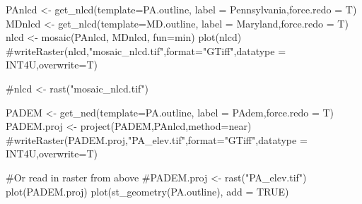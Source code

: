 \documentclass[
  letterpaper,
]{book}
\newenvironment{Shaded}{\begin{snugshade}}{\end{snugshade}}
\newcommand{\AttributeTok}[1]{\textcolor[rgb]{0.40,0.45,0.13}{#1}}
\newcommand{\CommentTok}[1]{\textcolor[rgb]{0.37,0.37,0.37}{#1}}
\newcommand{\ConstantTok}[1]{\textcolor[rgb]{0.56,0.35,0.01}{#1}}
\newcommand{\FunctionTok}[1]{\textcolor[rgb]{0.28,0.35,0.67}{#1}}
\newcommand{\NormalTok}[1]{\textcolor[rgb]{0.00,0.23,0.31}{#1}}
\newcommand{\OtherTok}[1]{\textcolor[rgb]{0.00,0.23,0.31}{#1}}
\newcommand{\StringTok}[1]{\textcolor[rgb]{0.13,0.47,0.30}{#1}}
\begin{document}
\begin{Shaded}
\begin{Highlighting}[]
\NormalTok{PAnlcd }\OtherTok{\textless{}{-}} \FunctionTok{get\_nlcd}\NormalTok{(}\AttributeTok{template=}\NormalTok{PA.outline, }\AttributeTok{label =} \StringTok{\textquotesingle{}Pennsylvania\textquotesingle{}}\NormalTok{,}\AttributeTok{force.redo =}\NormalTok{ T)}
\NormalTok{MDnlcd }\OtherTok{\textless{}{-}} \FunctionTok{get\_nlcd}\NormalTok{(}\AttributeTok{template=}\NormalTok{MD.outline, }\AttributeTok{label =} \StringTok{\textquotesingle{}Maryland\textquotesingle{}}\NormalTok{,}\AttributeTok{force.redo =}\NormalTok{ T)}
\NormalTok{nlcd }\OtherTok{\textless{}{-}} \FunctionTok{mosaic}\NormalTok{(PAnlcd, MDnlcd, }\AttributeTok{fun=}\NormalTok{min)}
\FunctionTok{plot}\NormalTok{(nlcd)}
\CommentTok{\#writeRaster(nlcd,"mosaic\_nlcd.tif",format="GTiff",datatype = \textquotesingle{}INT4U\textquotesingle{},overwrite=T)}

\CommentTok{\#nlcd \textless{}{-} rast("mosaic\_nlcd.tif")}

\NormalTok{PADEM }\OtherTok{\textless{}{-}} \FunctionTok{get\_ned}\NormalTok{(}\AttributeTok{template=}\NormalTok{PA.outline, }\AttributeTok{label =} \StringTok{\textquotesingle{}PAdem\textquotesingle{}}\NormalTok{,}\AttributeTok{force.redo =}\NormalTok{ T)}
\NormalTok{PADEM.proj }\OtherTok{\textless{}{-}} \FunctionTok{project}\NormalTok{(PADEM,PAnlcd,}\AttributeTok{method=}\StringTok{\textquotesingle{}near\textquotesingle{}}\NormalTok{)}
\CommentTok{\#writeRaster(PADEM.proj,"PA\_elev.tif",format="GTiff",datatype = \textquotesingle{}INT4U\textquotesingle{},overwrite=T)}

\CommentTok{\#Or read in raster from above}
\CommentTok{\#PADEM.proj \textless{}{-} rast("PA\_elev.tif")}
\FunctionTok{plot}\NormalTok{(PADEM.proj)}
\FunctionTok{plot}\NormalTok{(}\FunctionTok{st\_geometry}\NormalTok{(PA.outline), }\AttributeTok{add =} \ConstantTok{TRUE}\NormalTok{)}
\end{Highlighting}
\end{Shaded}
\end{document}

